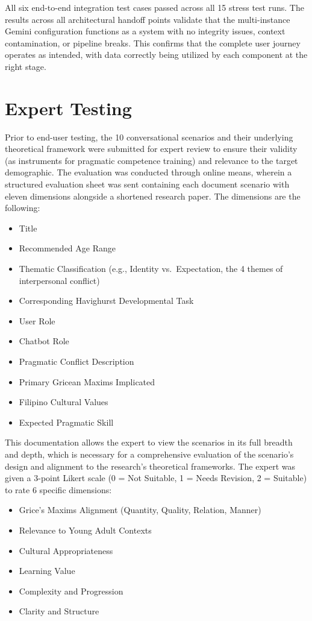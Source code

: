\noindent All six end-to-end integration test cases passed across all 15 stress test runs. The results across all architectural handoff points validate that the multi-instance Gemini configuration functions as a system with no integrity issues, context contamination, or pipeline breaks. This confirms that the complete user journey operates as intended, 
with data correctly being utilized by each component at the right stage.

\section{Expert Testing}
Prior to end-user testing, the 10 conversational scenarios and their underlying theoretical framework were submitted for expert review to ensure their validity (as instruments for pragmatic competence training) and relevance to the target demographic. The evaluation was conducted through online means,
wherein a structured evaluation sheet was sent containing each document scenario with eleven dimensions alongside a shortened research paper. The dimensions are the following:

\begin{itemize}
  \item Title
  \item Recommended Age Range
  \item Thematic Classification (e.g., Identity vs.\ Expectation, the 4 themes of interpersonal conflict)
  \item Corresponding Havighurst Developmental Task
  \item User Role
  \item Chatbot Role
  \item Pragmatic Conflict Description
  \item Primary Gricean Maxims Implicated
  \item Filipino Cultural Values
  \item Expected Pragmatic Skill
\end{itemize}

This documentation allows the expert to view the scenarios in its full breadth and depth, which is necessary for a comprehensive evaluation of the scenario's design and alignment to the research's theoretical frameworks. The expert was given a 3-point Likert scale (0 = Not Suitable, 1 = Needs Revision, 2 = Suitable) to rate 6 specific dimensions:

\begin{itemize}
  \item Grice's Maxims Alignment (Quantity, Quality, Relation, Manner)
  \item Relevance to Young Adult Contexts 
  \item Cultural Appropriateness 
  \item Learning Value 
  \item Complexity and Progression 
  \item Clarity and Structure 
\end{itemize}

